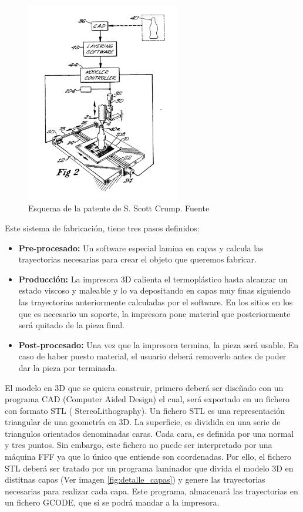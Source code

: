     \begin{figure}[H]
            \centering
            \includegraphics[width=0.6\textwidth]{images/estado.arte/US5340433-2.png}
            \caption{Esquema de la patente de S. Scott Crump. Fuente  \cite{crump1992apparatus}}
            \label{fig:impr_patente_sistema}
    \end{figure}

Este sistema de fabricación, tiene tres pasos definidos:
\begin{itemize}
    \item \textbf{Pre-procesado:} Un software especial lamina en capas y calcula las trayectorias necesarias para crear el objeto que queremos fabricar.
    \item \textbf{Producción:} La impresora 3D calienta el termoplástico hasta alcanzar un estado viscoso y maleable y lo va depositando en capas muy finas siguiendo las trayectorias anteriormente calculadas por el software. En los sitios en los que es necesario un soporte, la impresora pone material que posteriormente será quitado de la pieza final.
    \item \textbf{Post-procesado:} Una vez que la impresora termina, la pieza será usable. En caso de haber puesto material, el usuario deberá removerlo antes de poder dar la pieza por terminada.
\end{itemize}

El modelo en 3D que se quiera construir, primero deberá ser diseñado con un programa CAD (Computer Aided Design) el cual, será exportado en un fichero con formato STL ( StereoLithography). Un fichero STL es una representación triangular de una geometría en 3D. La superficie, es dividida en una serie de triangulos orientados denominadas caras. Cada cara, es definida por una normal y tres puntos\cite{stl}. Sin embargo, este fichero no puede ser interpretado por una máquina FFF ya que lo único que entiende son coordenadas. Por ello, el fichero STL deberá ser tratado por un programa laminador que divida el modelo 3D en distitnas capas (Ver imagen \ref{fig:detalle_capas}) y genere las trayectorias necesarias para realizar cada capa. Este programa, almacenará las trayectorias en un fichero GCODE, que sí se podrá mandar a la impresora.

